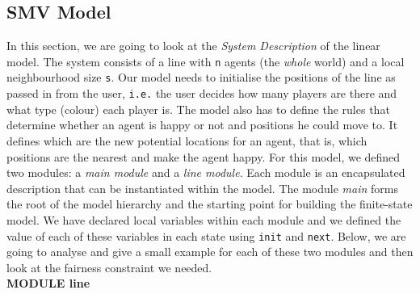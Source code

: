 \documentclass[../main.tex]{subfiles}
\begin{document}
\subsection{SMV Model}
In this section, we are going to look at the \textit{System Description} of the linear model. The system consists of a line with \verb|n| agents (the \textit{whole} world) and a local neighbourhood size \verb|s|. Our model needs to initialise the positions of the line as passed in from the user, \verb|i.e.| the user decides how many players are there and what type (colour) each player is. The model also has to define the rules that determine whether an agent is happy or not and positions he could move to. It defines which are the new potential locations for an agent, that is, which positions are the nearest and make the agent happy. For this model, we defined two modules: a \textit{main module} and a \textit{line module}. Each module is an encapsulated description that can be instantiated within the model. The module \textit{main} forms the root of the model hierarchy and the starting point for building the finite-state model. We have declared local variables within each module and we defined the value of each of these variables in each state using \verb|init| and \verb|next|. Below, we are going to analyse and give a small example for each of these two modules and then look at the fairness constraint we needed. \\


\textbf{MODULE line}
\end{document}
